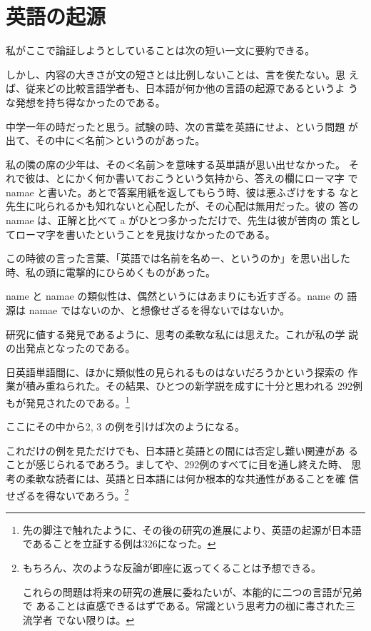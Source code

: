 ﻿\documentclass[11pt,twoside]{jreport}
\begin{document}
\section{英語の起源}

私がここで論証しようとしていることは次の短い一文に要約できる。


  しかし、内容の大きさが文の短さとは比例しないことは、言を俟たない。思
えば、従来どの比較言語学者も、日本語が何か他の言語の起源であるというよ
うな発想を持ち得なかったのである。

  中学一年の時だったと思う。試験の時、次の言葉を英語にせよ、という問題
が出て、その中に＜名前＞というのがあった。

  私の隣の席の少年は、その＜名前＞を意味する英単語が思い出せなかった。
それで彼は、とにかく何か書いておこうという気持から、答えの欄にローマ字
で namae と書いた。あとで答案用紙を返してもらう時、彼は悪ふざけをする
なと先生に叱られるかも知れないと心配したが、その心配は無用だった。彼の
答の namae は、正解と比べて a がひとつ多かっただけで、先生は彼が苦肉の
策としてローマ字を書いたということを見抜けなかったのである。

\noindent
この時彼の言った言葉、「英語では名前を名めー、というのか」を思い出した
時、私の頭に電撃的にひらめくものがあった。

  name と namae の類似性は、偶然というにはあまりにも近すぎる。name の
語源は namae ではないのか、と想像せざるを得ないではないか。

  研究に値する発見であるように、思考の柔軟な私には思えた。これが私の学
説の出発点となったのである。

  日英語単語間に、ほかに類似性の見られるものはないだろうかという探索の
作業が積み重ねられた。その結果、ひとつの新学説を成すに十分と思われる
292例もが発見されたのである。\footnote{
先の脚注で触れたように、その後の研究の進展により、英語の起源が日本語
であることを立証する例は326になった。
} %

  ここにその中から2, 3 の例を引けば次のようになる。


  これだけの例を見ただけでも、日本語と英語との間には否定し難い関連があ
ることが感じられるであろう。ましてや、292例のすべてに目を通し終えた時、
思考の柔軟な読者には、英語と日本語には何か根本的な共通性があることを確
信せざるを得ないであろう。\footnote{
もちろん、次のような反論が即座に返ってくることは予想できる。

\noindent
これらの問題は将来の研究の進展に委ねたいが、本能的に二つの言語が兄弟で
あることは直感できるはずである。常識という思考力の枷に毒された三流学者
でない限りは。
} %
\end{document}
